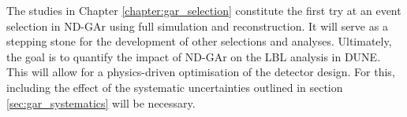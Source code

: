 \begin{comment}
Finally, in Chapter \ref{chapter:gar_selection} I apply to the event selection in ND-GAr. I start by describing a method for selecting $\nu_{\mu}$ CC events in section \ref{sec:gar_numu_cc}. This is mainly based on the muon score derived from the muon/pion classification I developed. Additionally, I perform an optimisation of the FV. As part of this study, I also examined the kinematics of the selected primary muon and the reconstructed interaction vertex. Next, in section \ref{sec:gar_charged_pions} I explore the capabilities of ND-GAr and its reconstruction at identifying charged pions. I optimise a selection based on the reconstructed charged pion multiplicity, for events with 0, 1, 2, and $\geq 3 \pi^{\pm}$ in the final state. I the performance of the selection as a function of the truth hadronic invariant mass, as well as the true pion kinematics for the $\nu_{\mu}$ CC $1\pi^{\pm}$ case. I briefly discuss the possibility of tagging events with neutral pions by reconstructing the invariant mass of the photon pairs from their decay in section \ref{sec:gar_neutral_pions}. Lastly, in section \ref{sec:gar_energy} I study the neutrino energy reconstruction of the selected $\nu_{\mu}$ CC events using a calorimetric approach. For this, I compare the values obtained using generator-level and reconstructed information.

These studies constitute the first try at an event selection in ND-GAr using full simulation and reconstruction. It will serve as a stepping stone for the development of other selections and analyses. Ultimately, the goal is to quantify the impact of ND-GAr on the LBL analysis in DUNE. For this, including the effect of the systematic uncertainties outlined in section \ref{sec:gar_systematics} will be necessary.
\end{comment}

The studies in Chapter \ref{chapter:gar_selection} constitute the first try at an event selection in ND-GAr using full simulation and reconstruction. It will serve as a stepping stone for the development of other selections and analyses. Ultimately, the goal is to quantify the impact of ND-GAr on the LBL analysis in DUNE. This will allow for a physics-driven optimisation of the detector design. For this, including the effect of the systematic uncertainties outlined in section \ref{sec:gar_systematics} will be necessary.

\begin{comment}
In summary, this thesis provides an overview of three novel topics within DUNE. As a single sentence, in this work I investigate the enhancement of the triggering capabilities of the FD, study the sensitivity of the FD to solar DM signatures, and develop the particle identification and event selection strategies for the Phase II ND. Each Chapter aims to be a comprehensive summary of the status of the different studies. I hope they can be helpful guides for future work both in the ND and FD.
\end{comment}